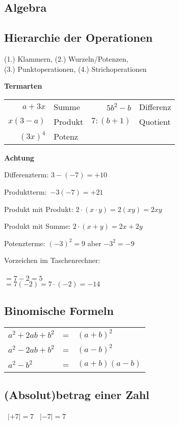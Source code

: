\begin{multicols}{2}
\section*{Algebra}
\subsection*{Hierarchie der Operationen}
(1.) Klammern, (2.) Wurzeln/Potenzen,\\
(3.) Punktoperationen, (4.) Strichoperationen

\textbf{Termarten}

\begin{tabular}{rlrl}
$a+3x$  &Summe  & $5b^2-b$ & Differenz\\
$x(3-a)$&Produkt& $7:(b+1)$& Quotient\\
$(3x)^4$&Potenz &          &
\end{tabular}

\textbf{Achtung}

Differenzterm:  $3-(-7) = +10$

Produktterm:\, $-3(-7) = +21$

Produkt mit Produkt: $2\cdot(x\cdot{}y) = 2(xy) = 2xy$

Produkt mit Summe: $2\cdot(x+y)=2x+2y$

Potenzterme: $(-3)^2 = 9$ aber $-3^2 = -9$


Vorzeichen im Taschenrechner:\\
\vspace{3mm}\\
$=7-2= 5$\\
$=7(-2)=7\cdot{}(-2)= -14$

\subsection*{Binomische Formeln}
\begin{tabular}{lcl}
  $a^2 + 2ab + b^2$  & =  &  $(a+b)^2$\\
  $a^2 - 2ab + b^2$  & =  &  $(a-b)^2$\\
  $a^2 - b^2$        & =  &  $(a+b)(a-b)$
\end{tabular} 


\subsection*{(Absolut)betrag einer Zahl}%
\hfill\, $|+7| = 7$ \hfill\, $|-7| = 7$ \hfill\, %


\end{multicols}
